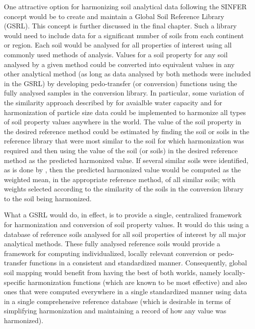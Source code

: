 \documentclass[11pt]{krantz}
\theoremstyle{definition}
\theoremstyle{definition}
\theoremstyle{definition}
\theoremstyle{remark}
\begin{document}
One attractive option for harmonizing soil analytical data following the
SINFER concept would be to create and maintain a Global Soil Reference
Library (GSRL). This concept is further discussed in the final chapter.
Such a library would need to include data for a significant number of
soils from each continent or region. Each soil would be analysed for all
properties of interest using all commonly used methods of analysis.
Values for a soil property for any soil analysed by a given method could
be converted into equivalent values in any other analytical method (as
long as data analysed by both methods were included in the GSRL) by
developing pedo-transfer (or conversion) functions using the fully
analysed samples in the conversion library. In particular, some
variation of the similarity approach described by
\citet{Jagtap2004TASAE} for avaialble water capacity and
\citet{Nemes1999G} for harmonization of particle size data could be
implemented to harmonize all types of soil property values anywhere in
the world. The value of the soil property in the desired reference
method could be estimated by finding the soil or soils in the reference
library that were most similar to the soil for which harmonization was
required and then using the value of the soil (or soils) in the desired
reference method as the predicted harmonized value. If several similar
soils were identified, as is done by \citet{Nemes1999G}, then the
predicted harmonized value would be computed as the weighted mean, in
the appropriate reference method, of all similar soils; with weights
selected according to the similarity of the soils in the conversion
library to the soil being harmonized.

What a GSRL would do, in effect, is to provide a single, centralized
framework for harmonization and conversion of soil property values. It
would do this using a database of reference soils analysed for all soil
properties of interest by all major analytical methods. These fully
analysed reference soils would provide a framework for computing
individualized, locally relevant conversion or pedo-transfer functions
in a consistent and standardized manner. Consequently, global soil
mapping would benefit from having the best of both worlds, namely
locally-specific harmonization functions (which are known to be most
effective) and also ones that were computed everywhere in a single
standardized manner using data in a single comprehensive reference
database (which is desirable in terms of simplifying harmonization and
maintaining a record of how any value was harmonized).
\end{document}
